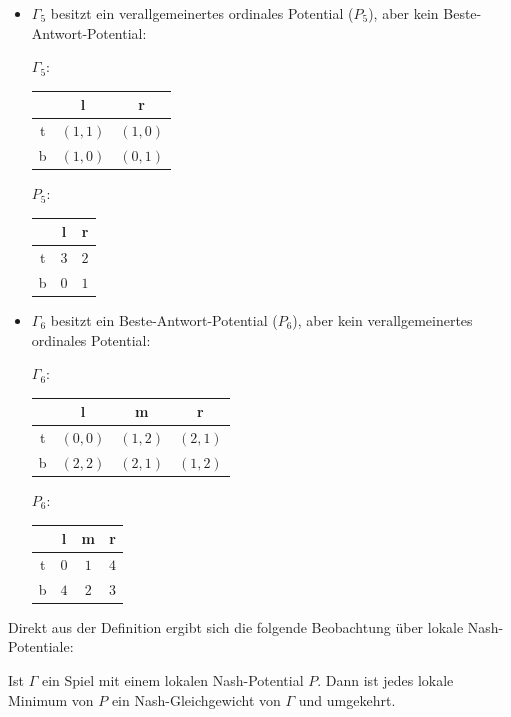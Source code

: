 \begin{bsp}
\begin{itemize}
\begin{center}
\begin{tabular}{c||c|c|c}
				\end{tabular}
			\end{center}
		\item $\Gamma_5$ besitzt ein verallgemeinertes ordinales Potential ($P_5$), aber kein Beste-Antwort-Potential:
			\begin{center}
				$\Gamma_5:$ \quad
				\begin{tabular}{c||c|c}
						& l 		& r 		\\\hline\hline
					t	& $(1,1)$	& $(1,0)$	\\\hline
					b	& $(1,0)$	& $(0,1)$ 
				\end{tabular}\hspace{5em}
				$P_5:$ \quad
				\begin{tabular}{c||c|c}
						& l 		& r 		\\\hline\hline
					t	& $3$	& $2$			\\\hline
					b	& $0$	& $1$ 
				\end{tabular}
			\end{center}
		\item $\Gamma_6$ besitzt ein Beste-Antwort-Potential ($P_6$), aber kein verallgemeinertes ordinales Potential:
			\begin{center}
				$\Gamma_6:$ \quad
				\begin{tabular}{c||c|c|c}
						& l 		& m			& r 		\\\hline\hline
					t	& $(0,0)$	& $(1,2)$	& $(2,1)$	\\\hline
					b	& $(2,2)$	& $(2,1)$ 	& $(1,2)$
				\end{tabular}\hspace{5em}
				$P_6:$ \quad
				\begin{tabular}{c||c|c|c}
						& l 		& m 		& r \\\hline\hline
					t	& $0$	& $1$		& $4$	\\\hline
					b	& $4$	& $2$ 		& $3$
				\end{tabular}
			\end{center}
	\end{itemize}
\end{bsp}

Direkt aus der Definition ergibt sich die folgende Beobachtung über lokale Nash-Potentiale:

\begin{beob}\label{beob:lokMinNG}
	Ist $\Gamma$ ein Spiel mit einem lokalen Nash-Potential $P$. Dann ist jedes lokale Minimum von $P$ ein Nash-Gleichgewicht von $\Gamma$ und umgekehrt.
\end{beob}

